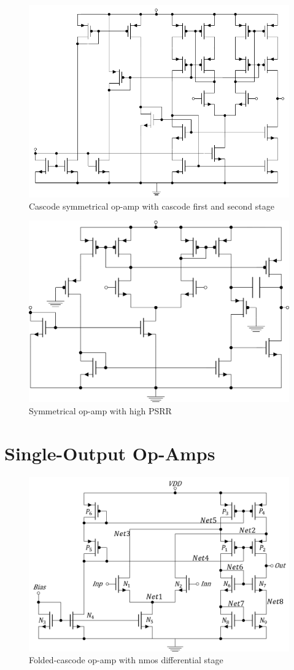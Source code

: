 \begin{figure}[H]
	\centering
	\includegraphics[width=0.8\linewidth]{Fig/SymmetricalOpAmp2}
	\caption{Cascode symmetrical op-amp with cascode first and second stage} \label{fig:SymmetricalOpAmp2}
\end{figure}

\begin{figure}[H]
	\centering
	\includegraphics[width=0.7\linewidth]{Fig/SymmetricalOTAWithSecondStage.png}
	\caption{Symmetrical op-amp with high PSRR \cite{LakerSansen}} \label{fig:SymmetricalOpAmpWithHighPSRR}
\end{figure}




\section{Single-Output Op-Amps}

\begin{figure}[H]
	\centering
	\includegraphics[width=0.75\linewidth]{Fig/foldedCascodeOpAmp.png}
	\caption{Folded-cascode op-amp with nmos differential stage} \label{fig:foldedCascodeOpAmpNMOS}
\end{figure}

